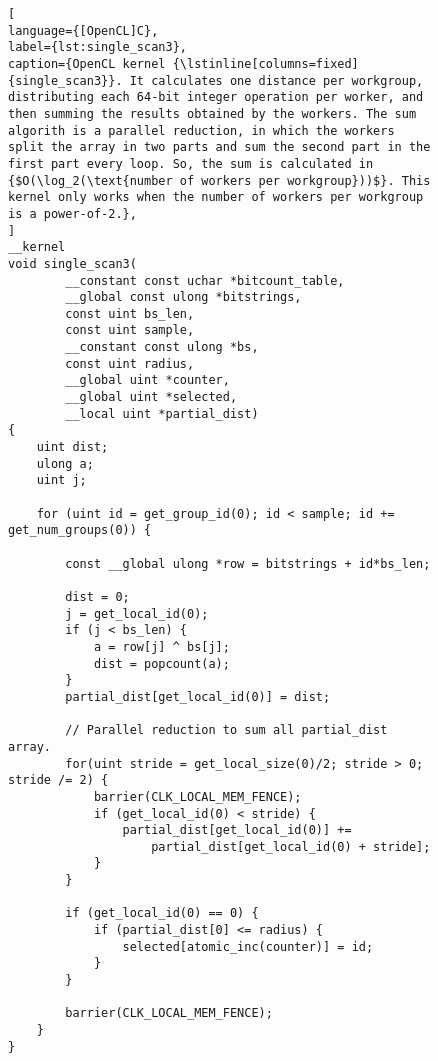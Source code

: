 \begin{figure}[!p]
\begin{lstlisting}[
language={[OpenCL]C},
label={lst:single_scan3},
caption={OpenCL kernel {\lstinline[columns=fixed]{single_scan3}}. It calculates one distance per workgroup, distributing each 64-bit integer operation per worker, and then summing the results obtained by the workers. The sum algorith is a parallel reduction, in which the workers split the array in two parts and sum the second part in the first part every loop. So, the sum is calculated in {$O(\log_2(\text{number of workers per workgroup}))$}. This kernel only works when the number of workers per workgroup is a power-of-2.},
]
__kernel
void single_scan3(
        __constant const uchar *bitcount_table,
        __global const ulong *bitstrings,
        const uint bs_len,
        const uint sample,
        __constant const ulong *bs,
        const uint radius,
        __global uint *counter,
        __global uint *selected,
        __local uint *partial_dist)
{
    uint dist;
    ulong a;
    uint j;

    for (uint id = get_group_id(0); id < sample; id += get_num_groups(0)) {

        const __global ulong *row = bitstrings + id*bs_len;

        dist = 0;
        j = get_local_id(0);
        if (j < bs_len) {
            a = row[j] ^ bs[j];
            dist = popcount(a);
        }
        partial_dist[get_local_id(0)] = dist;

        // Parallel reduction to sum all partial_dist array.
        for(uint stride = get_local_size(0)/2; stride > 0; stride /= 2) {
            barrier(CLK_LOCAL_MEM_FENCE);
            if (get_local_id(0) < stride) {
                partial_dist[get_local_id(0)] +=
                    partial_dist[get_local_id(0) + stride];
            }
        }

        if (get_local_id(0) == 0) {
            if (partial_dist[0] <= radius) {
                selected[atomic_inc(counter)] = id;
            }
        }

        barrier(CLK_LOCAL_MEM_FENCE);
    }
}
\end{lstlisting}
\end{figure}


